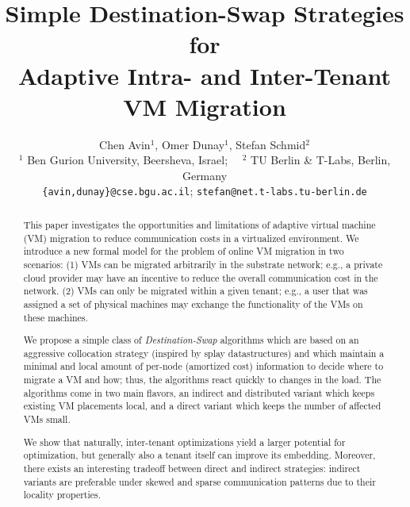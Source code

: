 \documentclass[conference]{IEEEtran}
\begin{document}
\title{Simple Destination-Swap Strategies for\\Adaptive Intra- and Inter-Tenant VM Migration}



\author {Chen Avin$^1$, Omer Dunay$^1$, Stefan Schmid$^2$\\
{\small $^1$ Ben Gurion University, Beersheva, Israel;~~ $^2$ TU Berlin \& T-Labs, Berlin, Germany}\\
{\small \texttt{\{avin,dunay\}@cse.bgu.ac.il}; \texttt{stefan@net.t-labs.tu-berlin.de}}\\}

\date{}


\maketitle \thispagestyle{empty}
\sloppy

\begin{abstract}
This paper investigates the opportunities and limitations of
adaptive virtual machine (VM) migration to reduce communication costs in a virtualized
environment. We introduce a new formal model for the problem of online VM migration in two scenarios: (1) VMs can be migrated arbitrarily in the substrate network;
e.g., a private cloud provider may have an incentive to reduce the overall communication cost in the network.
(2) VMs can only be migrated within a given tenant; e.g., a user that was assigned a set of physical machines
may exchange the functionality of the VMs on these machines.

We propose a simple class of \emph{Destination-Swap} algorithms which are based on an aggressive collocation strategy
(inspired by splay datastructures) and which maintain a minimal and local amount of per-node (amortized cost) information
to decide where to migrate a VM and how; thus, the algorithms react quickly to changes in the load.
The algorithms
come in two main flavors, an indirect and distributed variant which keeps existing VM placements local, and a direct variant
 which keeps the number of affected VMs small.

We show that naturally, inter-tenant optimizations yield a larger
potential for optimization, but generally also a tenant itself can improve its embedding. Moreover, there exists an interesting
tradeoff between direct and indirect strategies: indirect variants are preferable under skewed and sparse communication patterns
due to their locality properties.
\end{abstract}
\end{document}
